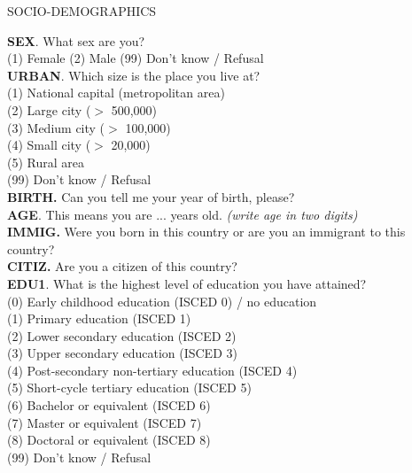 \documentclass[11pt, ngerman,english,a4]{article}
\begin{document}
\newpage

\begin{center}
    SOCIO-DEMOGRAPHICS \\
\end{center}

\noindent \textbf{SEX}. What sex are you? \\
(1) Female (2) Male (99) Don't know / Refusal \\

\noindent \textbf{URBAN}. Which size is the place you live at? \\
(1) National capital (metropolitan area) \\
(2) Large city ($>$ 500,000) \\
(3) Medium city ($>$ 100,000) \\
(4) Small city ($>$ 20,000) \\
(5) Rural area \\
(99) Don't know / Refusal \\

\noindent \textbf{BIRTH.} Can you tell me your year of birth, please? \\

\noindent \textbf{AGE}. This means you are ... years old. \textit{(write age in two digits)} \\

\noindent \textbf{IMMIG.} Were you born in this country or are you an immigrant to this country?  \\

\noindent \textbf{CITIZ.} Are you a citizen of this country? \\	

\noindent \textbf{EDU1}. What is the highest level of education you have attained? \\
(0) Early childhood education (ISCED 0) / no education  \\
(1) Primary education (ISCED 1) \\
(2) Lower secondary education (ISCED 2) \\
(3) Upper secondary education (ISCED 3) \\
(4) Post-secondary non-tertiary education (ISCED 4) \\
(5) Short-cycle tertiary education (ISCED 5) \\
(6) Bachelor or equivalent (ISCED 6) \\
(7) Master or equivalent (ISCED 7) \\
(8) Doctoral or equivalent (ISCED 8) \\
(99) Don't know / Refusal \\
\end{document}
